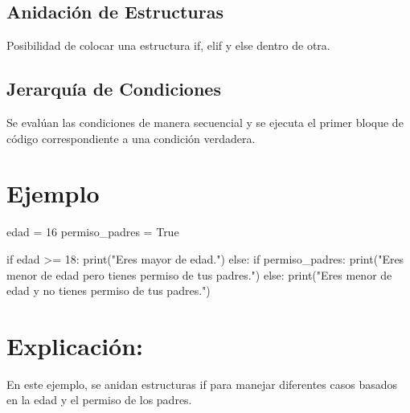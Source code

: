 \documentclass[
  a4paper,
  onepage,
  openany]{scrreprt}
\newenvironment{Shaded}{\begin{snugshade}}{\end{snugshade}}
\newcommand{\BuiltInTok}[1]{\textcolor[rgb]{0.00,0.23,0.31}{#1}}
\newcommand{\ControlFlowTok}[1]{\textcolor[rgb]{0.00,0.23,0.31}{#1}}
\newcommand{\DecValTok}[1]{\textcolor[rgb]{0.68,0.00,0.00}{#1}}
\newcommand{\NormalTok}[1]{\textcolor[rgb]{0.00,0.23,0.31}{#1}}
\newcommand{\OperatorTok}[1]{\textcolor[rgb]{0.37,0.37,0.37}{#1}}
\newcommand{\StringTok}[1]{\textcolor[rgb]{0.13,0.47,0.30}{#1}}
\newcommand{\VariableTok}[1]{\textcolor[rgb]{0.07,0.07,0.07}{#1}}
\begin{document}
\hypertarget{anidaciuxf3n-de-estructuras-1}{%
\subsection{Anidación de
Estructuras}\label{anidaciuxf3n-de-estructuras-1}}

Posibilidad de colocar una estructura if, elif y else dentro de otra.

\hypertarget{jerarquuxeda-de-condiciones-1}{%
\subsection{Jerarquía de
Condiciones}\label{jerarquuxeda-de-condiciones-1}}

Se evalúan las condiciones de manera secuencial y se ejecuta el primer
bloque de código correspondiente a una condición verdadera.

\hypertarget{ejemplo-33}{%
\section{Ejemplo}\label{ejemplo-33}}

\begin{Shaded}
\begin{Highlighting}[]
\NormalTok{edad }\OperatorTok{=} \DecValTok{16}
\NormalTok{permiso\_padres }\OperatorTok{=} \VariableTok{True}

\ControlFlowTok{if}\NormalTok{ edad }\OperatorTok{\textgreater{}=} \DecValTok{18}\NormalTok{:}
    \BuiltInTok{print}\NormalTok{(}\StringTok{"Eres mayor de edad."}\NormalTok{)}
\ControlFlowTok{else}\NormalTok{:}
    \ControlFlowTok{if}\NormalTok{ permiso\_padres:}
        \BuiltInTok{print}\NormalTok{(}\StringTok{"Eres menor de edad pero tienes permiso de tus padres."}\NormalTok{)}
    \ControlFlowTok{else}\NormalTok{:}
        \BuiltInTok{print}\NormalTok{(}\StringTok{"Eres menor de edad y no tienes permiso de tus padres."}\NormalTok{)}
\end{Highlighting}
\end{Shaded}

\hypertarget{explicaciuxf3n-33}{%
\section{Explicación:}\label{explicaciuxf3n-33}}

En este ejemplo, se anidan estructuras if para manejar diferentes casos
basados en la edad y el permiso de los padres.
\end{document}
